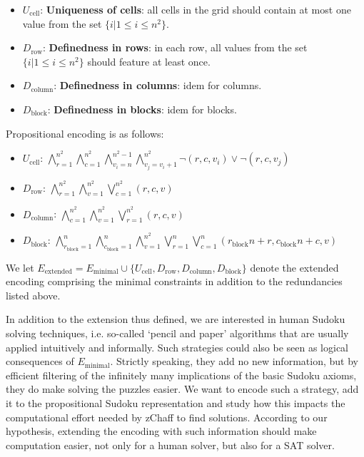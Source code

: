 \documentclass[10pt,a4paper,leqno]{article}
\newcommand{\ucell}{U_{\text{cell}}}
\newcommand{\drow}{D_{\text{row}}}
\newcommand{\dcol}{D_{\text{column}}}
\newcommand{\dblock}{D_{\text{block}}}
\begin{document}
\begin{itemize}

\item $\ucell$: \textbf{Uniqueness of cells}: all cells in the grid should contain at most one value from the set $\{i | 1 \leq i \leq n^2\}$.

\item $\drow$: \textbf{Definedness in rows}: in each row, all values from the set $\{i | 1 \leq i \leq n^2\}$ should feature at least once. 

\item $\dcol$: \textbf{Definedness in columns}: idem for columns. 

\item $\dblock$: \textbf{Definedness in blocks}: idem for blocks. 

\end{itemize}

Propositional encoding is as follows: 

\begin{itemize}

\item $\ucell$: 
$\bigwedge_{r=1}^{n^2} \bigwedge_{c=1}^{n^2}\bigwedge_{v_i=n}^{n^2 - 1} \bigwedge_{v_j=v_i+1}^{n^2} \neg(r,c,v_i) \lor \neg(r,c,v_j)$


\item $\drow$:
$\bigwedge_{r=1}^{n^2} \bigwedge_{v=1}^{n^2} \bigvee_{c=1}^{n^2} (r,c,v)$

\item $\dcol$: 
$\bigwedge_{c=1}^{n^2} \bigwedge_{v=1}^{n^2} \bigvee_{r=1}^{n^2} (r,c,v)$

\item $\dblock$:  
$\bigwedge_{r_{\text{block}} = 1}^{n} \bigwedge_{c_{\text{block}} = 1}^{n}\bigwedge_{v=1}^{n^2} \bigvee_{r = 1}^{n} \bigvee_{c = 1}^{n} (r_{\text{block}} n + r ,c_{\text{block}} n +c,v) $

\end{itemize}

We let $E_{\text{extended}} = E_{\text{minimal}} \cup \{\ucell,\drow,\dcol,\dblock\}$ denote the extended encoding comprising the minimal constraints in addition to the redundancies listed above. 

In addition to the extension thus defined, we are interested in human Sudoku solving techniques, i.e. so-called `pencil and paper' algorithms that are usually applied intuitively and informally. Such strategies could also be seen as logical consequences of $E_{\text{minimal}}$. Strictly speaking, they add no new information, but by efficient filtering of the infinitely many implications of the basic Sudoku axioms, they do make solving the puzzles easier. We want to encode such a strategy, add it to the propositional Sudoku representation and study how this impacts the computational effort needed by zChaff to find solutions. According to our hypothesis, extending the encoding with such information should make computation easier, not only for a human solver, but also for a SAT solver.
\end{document}
